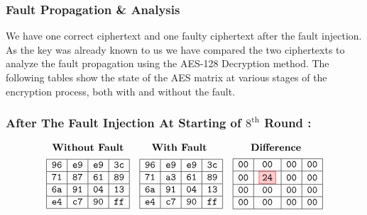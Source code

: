 \subsubsection{Fault Propagation \& Analysis}
We have one correct ciphertext and one faulty ciphertext after the fault injection. As the key was already known to us we have compared the two ciphertexts to analyze the fault propagation using the AES-128 Decryption method. The following tables show the state of the AES matrix at various stages of the encryption process, both with and without the fault.


\subsubsection{After The Fault Injection At Starting of $8^{\text{th}}$ Round :}
\[
\begin{array}{ccc}
\textbf{Without Fault} & \textbf{With Fault } & \textbf{Difference } \\[1ex]
\begin{array}{|c|c|c|c|}
\hline
\texttt{96} & \texttt{e9} & \texttt{e9} & \texttt{3c} \\
\hline
\texttt{71} & \texttt{87} & \texttt{61} & \texttt{89} \\
\hline
\texttt{6a} & \texttt{91} & \texttt{04} & \texttt{13} \\
\hline
\texttt{e4} & \texttt{c7} & \texttt{90} & \texttt{ff} \\
\hline
\end{array} 
&

\begin{array}{|c|c|c|c|}
    \hline
    \texttt{96} & \texttt{e9} & \texttt{e9} & \texttt{3c} \\
    \hline
    \texttt{71} & \texttt{a3} & \texttt{61} & \texttt{89} \\
    \hline
    \texttt{6a} & \texttt{91} & \texttt{04} & \texttt{13} \\
    \hline
    \texttt{e4} & \texttt{c7} & \texttt{90} & \texttt{ff} \\
    \hline
    \end{array}

    &

\begin{array}{|c|c|c|c|}
    \hline
    \texttt{00} & \texttt{00} & \texttt{00} &\texttt{00} \\
    \hline
    {\texttt{00}} & \fcolorbox{red}{red!20}{\texttt{24}} & \texttt{00} & \texttt{00} \\
    \hline
    \texttt{00} & \texttt{00} & \texttt{00} & \texttt{00} \\
    \hline
    \texttt{00} & \texttt{00} & \texttt{00} & \texttt{00} \\
    \hline
    \end{array}
\end{array}
\]

